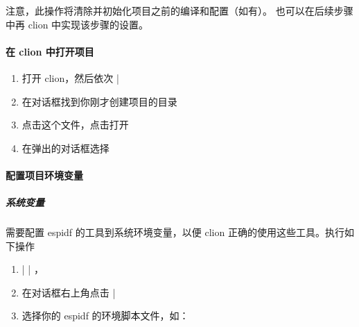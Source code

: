 \documentclass[a4paper,12pt,english]{sphinxmanual}
\begin{document}
\sphinxAtStartPar
注意，此操作将清除并初始化项目之前的编译和配置（如有）。 也可以在后续步骤中再 clion 中实现该步骤的设置。


\paragraph{在 clion 中打开项目}
\label{\detokenize{exp-esp32/ide/esp-idf-clion-dev:id9}}\begin{enumerate}
%
\item {} 
\sphinxAtStartPar
打开 clion，然后依次 | 

\item {} 
\sphinxAtStartPar
在对话框找到你刚才创建项目的目录

\item {} 
\sphinxAtStartPar
点击这个文件，点击打开

\item {} 
\sphinxAtStartPar
在弹出的对话框选择

\end{enumerate}


\paragraph{配置项目环境变量}
\label{\detokenize{exp-esp32/ide/esp-idf-clion-dev:id10}}

\subparagraph{系统变量}
\label{\detokenize{exp-esp32/ide/esp-idf-clion-dev:id11}}
\sphinxAtStartPar
需要配置 esp\sphinxhyphen{}idf 的工具到系统环境变量，以便 clion 正确的使用这些工具。执行如下操作
\begin{enumerate}
%
\item {} 
\sphinxAtStartPar
{} \sphinxhyphen{}|  | ，

\item {} 
\sphinxAtStartPar
在对话框右上角点击  | 

\item {} 
\sphinxAtStartPar
选择你的 esp\sphinxhyphen{}idf 的环境脚本文件，如：

\end{enumerate}
\end{document}

